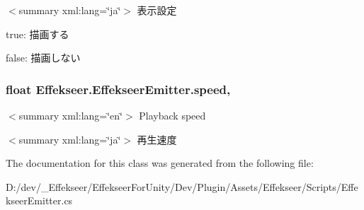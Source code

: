 $<$summary xml\-:lang=\char`\"{}ja\char`\"{}$>$ 表示設定 

true\-: 描画する

false\-: 描画しない\hypertarget{class_effekseer_1_1_effekseer_emitter_a0cbf08f0a3908780bfbe6933cc5baf1e}{
\subsubsection[{speed}]{\setlength{\rightskip}{0pt plus 5cm}float Effekseer.\-Effekseer\-Emitter.\-speed\hspace{0.3cm}{\ttfamily [get]}, {\ttfamily [set]}}}\label{class_effekseer_1_1_effekseer_emitter_a0cbf08f0a3908780bfbe6933cc5baf1e}
$<$summary xml\-:lang=\char`\"{}en\char`\"{}$>$ Playback speed 

$<$summary xml\-:lang=\char`\"{}ja\char`\"{}$>$ 再生速度 

The documentation for this class was generated from the following file\-:\begin{DoxyCompactItemize}
\item 
D\-:/dev/\-\_\-\-Effekseer/\-Effekseer\-For\-Unity/\-Dev/\-Plugin/\-Assets/\-Effekseer/\-Scripts/Effekseer\-Emitter.\-cs\end{DoxyCompactItemize}

